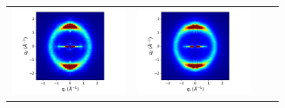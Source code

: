 \documentclass{article}
\begin{document}
\begin{figure}[!htb]
\begin{subfigure}{0.915\textwidth}
\begin{tabular}{@{}c@{ }c@{ }c@{ }c@{}}
  	\includegraphics[width=.28\linewidth,trim={1cm 0 1.3cm 0},clip]{solvated_layered_rzplot_25.png}&
  	\includegraphics[width=.28\linewidth,trim={1cm 0 1.3cm 0},clip]{solvated_layered_rzplot_5.png}\\[-1ex]
  	\end{tabular}
  \end{subfigure}
  \begin{subfigure}{0.075\textwidth}

\end{subfigure}
\end{figure}
\end{document}
